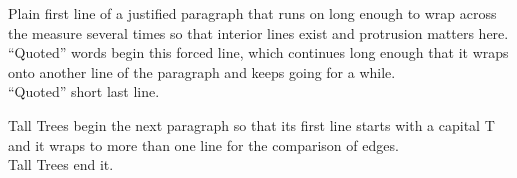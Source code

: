 \documentclass{article}
\begin{document}
Plain first line of a justified paragraph that runs on long enough to wrap across the measure several times so that interior lines exist and protrusion matters here.\\
“Quoted” words begin this forced line, which continues long enough that it wraps onto another line of the paragraph and keeps going for a while.\\
“Quoted” short last line.

Tall Trees begin the next paragraph so that its first line starts with a capital T and it wraps to more than one line for the comparison of edges.\\
Tall Trees end it.
\end{document}
